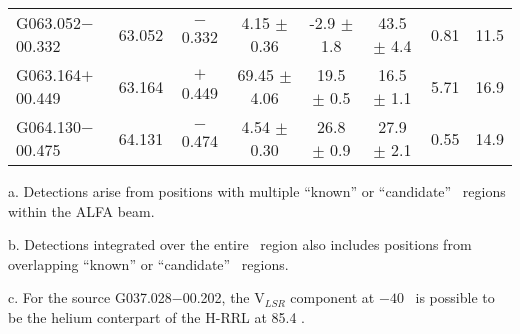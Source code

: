 \begin{ThreePartTable}
\begin{longtable}{lccccccc}
G063.052$-$00.332     &63.052&	$-$0.332	&4.15	$\pm$ 0.36	&-2.9	$\pm$ 1.8	&43.5	$\pm$ 4.4	&0.81	&11.5\\
G063.164$+$00.449     &63.164&	$+$0.449	&69.45	$\pm$ 4.06	&19.5	$\pm$ 0.5	&16.5	$\pm$ 1.1	&5.71	&16.9\\
G064.130$-$00.475     &64.131&	$-$0.474	&4.54	$\pm$ 0.30	&26.8	$\pm$ 0.9	&27.9	$\pm$ 2.1	&0.55	&14.9\\
\end{longtable}
\begin{tablenotes}
	\item a. Detections arise from positions with multiple ``known'' or ``candidate'' \hii\ regions within the ALFA beam.
	\item b. Detections integrated over the entire \hii\ region also includes positions from overlapping ``known'' or ``candidate'' \hii\ regions.
	\item c. For the source G037.028$-$00.202, the V$_{LSR}$ component at $-40$ \kms\ is possible to be the helium conterpart of the H-RRL at 85.4 \kms.
\end{tablenotes}
\end{ThreePartTable}
